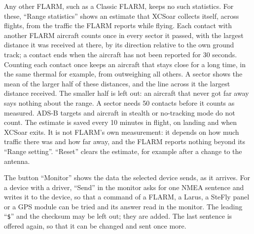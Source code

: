 Any other FLARM, such as a Classic FLARM, keeps no such statistics.
For these, ``Range statistics'' shows an estimate that XCSoar collects
itself, across flights, from the traffic the FLARM reports while
flying.  Each contact with another FLARM aircraft counts once in every
sector it passed, with the largest distance it was received at there,
by its direction relative to the own ground track; a contact ends when
the aircraft has not been reported for 30 seconds.  Counting each
contact once keeps an aircraft that stays close for a long time, in
the same thermal for example, from outweighing all others.  A sector
shows the mean of the larger half of these distances, and the line
across it the largest distance received.  The smaller half is left
out: an aircraft that never got far away says nothing about the range.
A sector needs 50 contacts before it counts as measured.  ADS-B targets and
aircraft in stealth or no-tracking mode do not count.  The estimate is
saved every 10 minutes in flight, on landing and when XCSoar exits.
It is not FLARM's own measurement: it depends on how much traffic
there was and how far away, and the FLARM reports nothing beyond its
``Range setting''.  ``Reset'' clears the estimate, for example after a
change to the antenna.

The button ``Monitor'' shows the data the selected device sends, as
it arrives.  For a device with a driver, ``Send'' in the monitor asks
for one NMEA sentence and writes it to the device, so that a command
of a FLARM, a Larus, a SteFly panel or a GPS module can be tried
and its answer read in the monitor.  The leading ``\texttt{\$}'' and
the checksum may be left out; they are added.  The last sentence is
offered again, so that it can be changed and sent once more.

